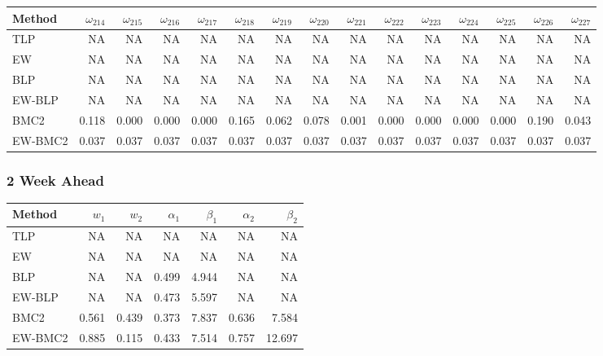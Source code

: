 \documentclass[
]{article}
\begin{document}
\begin{tabular}{lrrrrrrrrrrrrrr}
\toprule
Method & $\omega_{214}$ & $\omega_{215}$ & $\omega_{216}$ & $\omega_{217}$ & $\omega_{218}$ & $\omega_{219}$ & $\omega_{220}$ & $\omega_{221}$ & $\omega_{222}$ & $\omega_{223}$ & $\omega_{224}$ & $\omega_{225}$ & $\omega_{226}$ & $\omega_{227}$\\
\midrule
TLP & NA & NA & NA & NA & NA & NA & NA & NA & NA & NA & NA & NA & NA & NA\\
EW & NA & NA & NA & NA & NA & NA & NA & NA & NA & NA & NA & NA & NA & NA\\
BLP & NA & NA & NA & NA & NA & NA & NA & NA & NA & NA & NA & NA & NA & NA\\
EW-BLP & NA & NA & NA & NA & NA & NA & NA & NA & NA & NA & NA & NA & NA & NA\\
BMC2 & 0.118 & 0.000 & 0.000 & 0.000 & 0.165 & 0.062 & 0.078 & 0.001 & 0.000 & 0.000 & 0.000 & 0.000 & 0.190 & 0.043\\
EW-BMC2 & 0.037 & 0.037 & 0.037 & 0.037 & 0.037 & 0.037 & 0.037 & 0.037 & 0.037 & 0.037 & 0.037 & 0.037 & 0.037 & 0.037\\
\bottomrule
\end{tabular}

\hypertarget{week-ahead-21}{%
\subsubsection{2 Week Ahead}\label{week-ahead-21}}

\begin{tabular}{lrrrrrr}
\toprule
Method & $w_1$ & $w_2$ & $\alpha_1$ & $\beta_1$ & $\alpha_2$ & $\beta_2$\\
\midrule
TLP & NA & NA & NA & NA & NA & NA\\
EW & NA & NA & NA & NA & NA & NA\\
BLP & NA & NA & 0.499 & 4.944 & NA & NA\\
EW-BLP & NA & NA & 0.473 & 5.597 & NA & NA\\
BMC2 & 0.561 & 0.439 & 0.373 & 7.837 & 0.636 & 7.584\\
EW-BMC2 & 0.885 & 0.115 & 0.433 & 7.514 & 0.757 & 12.697\\
\bottomrule
\end{tabular}
\end{document}
